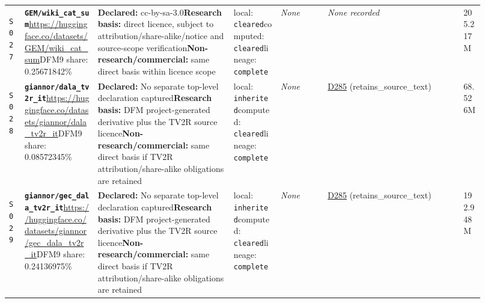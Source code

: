 \documentclass[9pt,a4paper]{article}
\newcommand{\srcid}[1]{\hypertarget{src:#1}{\texttt{#1}}}
\begin{document}
\begin{landscape}
\begin{longtable}{@{}L{0.03\linewidth}L{0.14\linewidth}L{0.26\linewidth}L{0.09\linewidth}L{0.09\linewidth}L{0.265\linewidth}L{0.045\linewidth}@{}}
\srcid{S027} & \textbf{\nolinkurl{GEM/wiki_cat_sum}}\newline \url{https://huggingface.co/datasets/GEM/wiki_cat_sum}\newline DFM9 share: 0.25671842\% & \textbf{Declared:} cc-by-sa-3.0\newline \textbf{Research basis:} direct licence, subject to attribution/share-alike/notice and source-scope verification\newline \textbf{Non-research/commercial:} same direct basis within licence scope & local: \texttt{cleared}\newline computed: \texttt{cleared}\newline lineage: \texttt{complete} & \textit{None} & \textit{None recorded} & 205.217M \\
\srcid{S028} & \textbf{\nolinkurl{giannor/dala_tv2r_it}}\newline \url{https://huggingface.co/datasets/giannor/dala_tv2r_it}\newline DFM9 share: 0.08572345\% & \textbf{Declared:} No separate top-level declaration captured\newline \textbf{Research basis:} DFM project-generated derivative plus the TV2R source licence\newline \textbf{Non-research/commercial:} same direct basis if TV2R attribution/share-alike obligations are retained & local: \texttt{inherited}\newline computed: \texttt{cleared}\newline lineage: \texttt{complete} & \textit{None} & \hyperlink{dep:D285}{D285} (retains\_source\_text) & 68.526M \\
\srcid{S029} & \textbf{\nolinkurl{giannor/gec_dala_tv2r_it}}\newline \url{https://huggingface.co/datasets/giannor/gec_dala_tv2r_it}\newline DFM9 share: 0.24136975\% & \textbf{Declared:} No separate top-level declaration captured\newline \textbf{Research basis:} DFM project-generated derivative plus the TV2R source licence\newline \textbf{Non-research/commercial:} same direct basis if TV2R attribution/share-alike obligations are retained & local: \texttt{inherited}\newline computed: \texttt{cleared}\newline lineage: \texttt{complete} & \textit{None} & \hyperlink{dep:D285}{D285} (retains\_source\_text) & 192.948M \\

\end{longtable}
\end{landscape}
\end{document}
